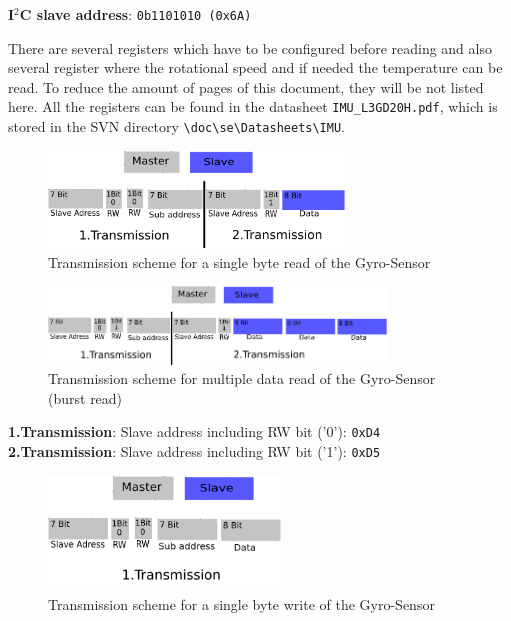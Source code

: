 \begin{itemize}
\begin{itemize}
\textbf{I$^2$C slave address}: \texttt{0b1101010 (0x6A)}

There are several registers which have to be configured before reading and also several register where the rotational speed and if needed the temperature can be read. To reduce the amount of pages of this document, they will be not listed here. All the registers can be found in the datasheet \texttt{IMU\_L3GD20H.pdf}, which is stored in the SVN directory \texttt{\textbackslash{}doc\textbackslash{}se\textbackslash{}Datasheets\textbackslash{}IMU}.

\begin{figure}[H]
	\centering\includegraphics[width=0.7\textwidth]{fig/I2C_Adressing/ACC_read_single}
	\caption{Transmission scheme for a single byte read of the Gyro-Sensor}
	\label{fig:Gyro1}
\end{figure}

\begin{figure}[H]
	\centering\includegraphics[width=0.8\textwidth]{fig/I2C_Adressing/ACC_read_multiple}
	\caption[Scheme for multiple data read of the Gyro-Sensor]{Transmission scheme for multiple data read of the Gyro-Sensor (burst read)}
	\label{fig:Gyro2}
\end{figure}

\textbf{1.Transmission}: Slave address including RW bit ('0'): \texttt{0xD4}\\
\textbf{2.Transmission}: Slave address including RW bit ('1'): \texttt{0xD5}

\begin{figure}[H]
	\centering\includegraphics[width=0.55\textwidth]{fig/I2C_Adressing/ACC_write_single}
	\caption[Scheme for a single byte write of the Gyro-Sensor]{Transmission scheme for a single byte write of the Gyro-Sensor}
	\label{fig:Gyro3}
\end{figure}


\end{itemize}
\end{itemize}

